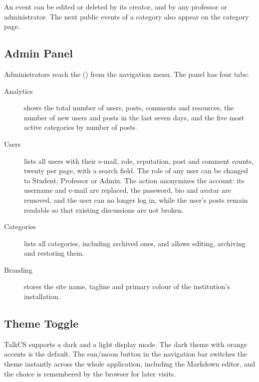 An event can be edited or deleted by its creator, and by any professor or
administrator. The next public events of a category also appear on the category page.


\subsection{Admin Panel}
\label{sec:guide-admin}

Administrators reach the  () from the navigation menu.
The panel has four tabs:

\begin{description}
  \item[Analytics] shows the total number of users, posts, comments and resources, the
    number of new users and posts in the last seven days, and the five most active
    categories by number of posts.
  \item[Users] lists all users with their e-mail, role, reputation, post and comment
    counts, twenty per page, with a search field. The role of any user can be changed
    to Student, Professor or Admin. The  action anonymizes the account: its
    username and e-mail are replaced, the password, bio and avatar are removed, and the
    user can no longer log in, while the user's posts remain readable so that existing
    discussions are not broken.
  \item[Categories] lists all categories, including archived ones, and allows editing,
    archiving and restoring them.
  \item[Branding] stores the site name, tagline and primary colour of the
    institution's installation.
\end{description}


\subsection{Theme Toggle}

TalkCS supports a dark and a light display mode. The dark theme with orange accents is
the default. The sun/moon button in the navigation bar switches the theme instantly
across the whole application, including the Markdown editor, and the choice is
remembered by the browser for later visits.

